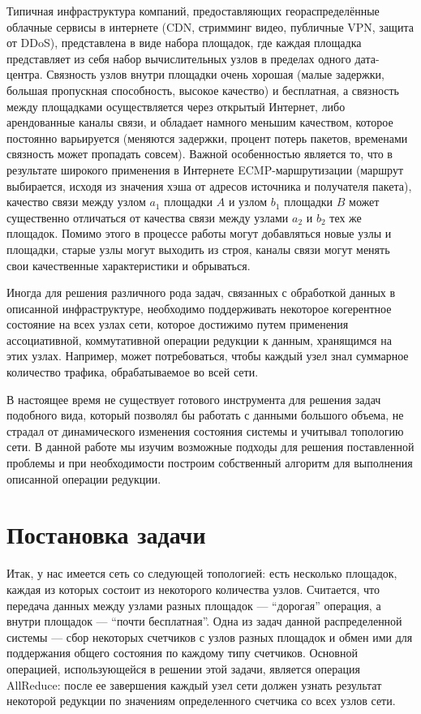 Типичная инфраструктура компаний, предоставляющих геораспределённые облачные сервисы в интернете (CDN, стримминг видео, публичные VPN, защита от DDoS), представлена в виде набора площадок, где каждая площадка представляет из себя набор вычислительных узлов в пределах одного дата-центра. Связность узлов внутри площадки очень хорошая (малые задержки, большая пропускная способность, высокое качество) и бесплатная, а связность между площадками осуществляется через открытый Интернет, либо арендованные каналы связи, и обладает намного меньшим качеством, которое постоянно варьируется (меняются задержки, процент потерь пакетов, временами связность может пропадать совсем). Важной особенностью является то, что в результате широкого применения в Интернете ECMP-маршрутизации (маршрут выбирается, исходя из значения хэша от адресов источника и получателя пакета), качество связи между узлом $a_1$ площадки $A$ и узлом $b_1$ площадки $B$ может существенно отличаться от качества связи между узлами $a_2$ и $b_2$ тех же площадок. Помимо этого в процессе работы могут добавляться новые узлы и площадки, старые узлы могут выходить из строя, каналы связи могут менять свои качественные характеристики и обрываться.

Иногда для решения различного рода задач, связанных с обработкой данных в описанной инфраструктуре, необходимо поддерживать некоторое когерентное состояние на всех узлах сети, которое достижимо путем применения ассоциативной, коммутативной операции редукции к данным, хранящимся на этих узлах. Например, может потребоваться, чтобы каждый узел знал суммарное количество трафика, обрабатываемое во всей сети.

В настоящее время не существует готового инструмента для решения задач подобного вида, который позволял бы работать с данными большого объема, не страдал от динамического изменения состояния системы и учитывал топологию сети. В данной работе мы изучим возможные подходы для решения поставленной проблемы и при необходимости построим собственный алгоритм для выполнения описанной операции редукции.

\section{Постановка задачи}

Итак, у нас имеется сеть со следующей топологией: есть несколько площадок, каждая из которых состоит из некоторого количества узлов. Считается, что передача данных между узлами разных площадок — \enquote{дорогая} операция, а внутри площадок — \enquote{почти бесплатная}. Одна из задач данной распределенной системы — сбор некоторых счетчиков с узлов разных площадок и обмен ими для поддержания общего состояния по каждому типу счетчиков. Основной операцией, использующейся в решении этой задачи, является операция AllReduce: после ее завершения каждый узел сети должен узнать результат некоторой редукции по значениям определенного счетчика со всех узлов сети.

